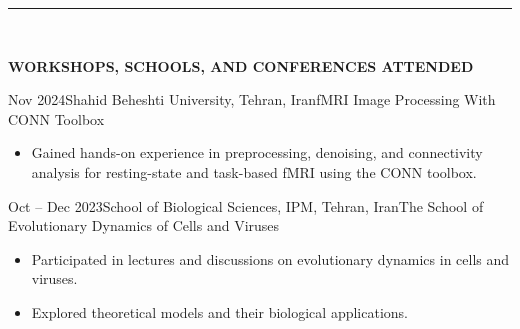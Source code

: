 \documentclass[12pt, b4paper]{cv}
\begin{document}
\vspace{-0.15in}
\rule{\textwidth}{1pt}\\
\vspace{-0.15in}

{\Large \textbf{WORKSHOPS, SCHOOLS, AND CONFERENCES ATTENDED}}
\vspace{0.1in}

\begin{school}{Nov 2024}{Shahid Beheshti University, Tehran, Iran}{fMRI Image Processing With CONN Toolbox}
\vspace{-0.1in}
	\begin{itemize}
	    \item Gained hands-on experience in preprocessing, denoising, and connectivity analysis for resting-state and task-based fMRI using the CONN toolbox.
	\end{itemize}
\end{school}




\begin{school}{Oct -- Dec 2023}{School of Biological Sciences, IPM, Tehran, Iran}{The School of Evolutionary Dynamics of Cells and Viruses}
\vspace{-0.1in}
	\begin{itemize}
	    \item Participated in lectures and discussions on evolutionary dynamics in cells and viruses.
	    \item Explored theoretical models and their biological applications.
	\end{itemize}
\end{school}


\end{document}
